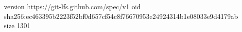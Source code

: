 version https://git-lfs.github.com/spec/v1
oid sha256:ec463395b2223f52bf0d657cf54c8f76670953e24924314b1e08033e9d4179ab
size 1301

